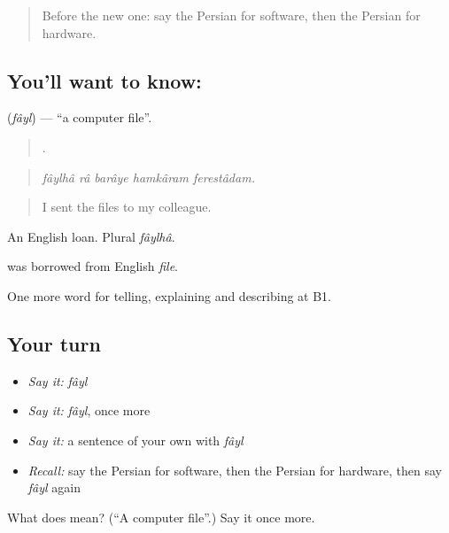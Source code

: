 \label{lesson:FA-C418-fayl}



\begin{quote}
Before the new one: say the Persian for software, then the Persian for hardware.
\end{quote}

\subsection*{You'll want to know: }
\textbf{} (\emph{fâyl}) — \textquotedblleft{}a computer file\textquotedblright{}.

\begin{quote}
    .
\end{quote}

\begin{quote}
\emph{fâylhâ râ barâye hamkâram ferestâdam.}
\end{quote}

\begin{quote}
I sent the files to my colleague.
\end{quote}

An English loan. Plural \emph{fâylhâ}.

\begin{cousinweb}
\textbf{} was borrowed from English \emph{file}.
\end{cousinweb}

\begin{grammarlens}[title={What you've built}]
One more word for telling, explaining and describing at B1.
\end{grammarlens}

\subsection*{Your turn}
\begin{itemize}
\raggedright
  \item \emph{Say it:} \emph{fâyl}
  \item \emph{Say it:} \emph{fâyl}, once more
  \item \emph{Say it:} a sentence of your own with \emph{fâyl}
  \item \emph{Recall:} say the Persian for software, then the Persian for hardware, then say \emph{fâyl} again
\end{itemize}

\begin{tcolorbox}[breakable,colback=teal!4,colframe=teal!35!black,title={Before you move on}]
What does  mean? (\textquotedblleft{}A computer file\textquotedblright{}.) Say it once more.
\end{tcolorbox}
